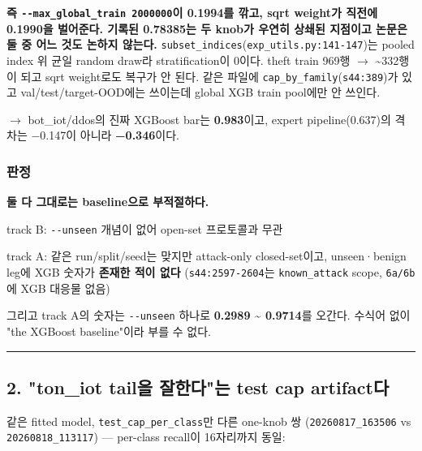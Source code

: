 \textbf{즉 \texttt{-\allowbreak{}-\allowbreak{}max\_\allowbreak{}\allowbreak{}gl\allowbreak{}obal\_\allowbreak{}\allowbreak{}tra\allowbreak{}in 20000\allowbreak{}00}이 0.1994를 깎고, sqrt weight가 직전에 0.1990을 벌어준다. 기록된 0.78385는 두 knob가 우연히 상쇄된 지점이고 논문은 둘 중 어느 것도 논하지 않는다.} \texttt{subset\_\allowbreak{}\allowbreak{}i\allowbreak{}ndices}(\texttt{exp\_\allowbreak{}\allowbreak{}util\allowbreak{}s.\allowbreak{}py:141\allowbreak{}-\allowbreak{}147})는 pooled index 위 균일 random draw라 stratification이 0이다. theft train 969행  \ensuremath{\rightarrow}  \textasciitilde{}332행이 되고 sqrt weight로도 복구가 안 된다. 같은 파일에 \texttt{cap\_\allowbreak{}\allowbreak{}by\_\allowbreak{}\allowbreak{}f\allowbreak{}amily}(\texttt{s44:389})가 있고 val/\allowbreak{}test/\allowbreak{}target-OOD에는 쓰이는데 global XGB train pool에만 안 쓰인다.

 \ensuremath{\rightarrow}  bot\_\allowbreak{}iot/\allowbreak{}ddos의 진짜 XGBoost bar는 \textbf{0.983}이고, expert pipeline(0.637)의 격차는 −0.147이 아니라 \textbf{−0.346}이다.

\subsubsection{판정}
\textbf{둘 다 그대로는 baseline으로 부적절하다.}

\par\noindent \textbullet\enspace track B: \texttt{-\allowbreak{}-\allowbreak{}unseen\allowbreak{}} 개념이 없어 open-set 프로토콜과 무관


\par\noindent \textbullet\enspace track A: 같은 run/\allowbreak{}split/\allowbreak{}seed는 맞지만 attack-only closed-set이고, unseen·benign leg에 XGB 숫자가 \textbf{존재한 적이 없다} (\texttt{s44:2597\allowbreak{}-\allowbreak{}2604}는 \texttt{known\_\allowbreak{}\allowbreak{}at\allowbreak{}tack} scope, \texttt{6a/\allowbreak{}\allowbreak{}6b}에 XGB 대응물 없음)


\par\noindent \textbullet\enspace 그리고 track A의 숫자는 \texttt{-\allowbreak{}-\allowbreak{}unseen\allowbreak{}} 하나로 \textbf{0.2989 \textasciitilde{} 0.9714}를 오간다. 수식어 없이 "the XGBoost baseline"이라 부를 수 없다.



\medskip\hrule\medskip
\subsection{2. "ton\_\allowbreak{}iot tail을 잘한다"는 test cap artifact다}
같은 fitted model, \texttt{test\_\allowbreak{}\allowbreak{}cap\allowbreak{}\_\allowbreak{}\allowbreak{}per\_\allowbreak{}\allowbreak{}cla\allowbreak{}ss}만 다른 one-knob 쌍 (\texttt{20260817\allowbreak{}\_\allowbreak{}\allowbreak{}163506} vs \texttt{20260818\allowbreak{}\_\allowbreak{}\allowbreak{}113117}) — per-class recall이 16자리까지 동일:

